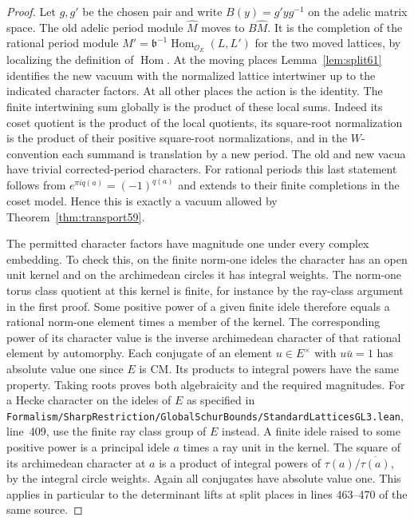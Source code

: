 \documentclass[a4paper,11pt]{article}
\theoremstyle{definition}
\theoremstyle{remark}
\newcommand{\srcloc}[2]{{\small\nolinkurl{#1.lean}}, line~#2}
\numberwithin{equation}{section}
\newcommand{\OO}{\mathcal O}
\begin{document}
\begin{proof}
Let \(g,g'\) be the chosen pair and write \(B(y)=g'y g^{-1}\)
on the adelic matrix space. The old adelic period module
\(\widehat M\) moves to \(B\widehat M\). It is the completion
of the rational period module
\(M'=\mathfrak b^{-1}\operatorname{Hom}_{\OO_E}(L,L')\) for
the two moved lattices, by localizing the definition of
\(\operatorname{Hom}\). At the moving places Lemma~\ref{lem:split61}
identifies the new vacuum with the normalized lattice intertwiner
up to the indicated character factors. At all other places the
action is the identity. The finite intertwining sum globally is
the product of these local sums. Indeed its coset quotient is
the product of the local quotients, its square-root normalization
is the product of their positive square-root normalizations, and
in the \(W\)-convention each summand is translation by a new
period. The old and new vacua have trivial corrected-period
characters. For rational periods this last statement follows
from \(e^{\pi i q(a)}=(-1)^{q(a)}\) and extends to their finite
completions in the coset model. Hence this is exactly a vacuum
allowed by Theorem~\ref{thm:transport59}.

The permitted character factors have magnitude one under every
complex embedding. To check this, on the finite norm-one ideles
the character has an open unit kernel and on the archimedean
circles it has integral weights. The norm-one torus class quotient
at this kernel is finite, for instance by the ray-class argument
in the first proof. Some positive power of a given finite
idele therefore equals a rational norm-one element times a member
of the kernel. The corresponding power of its character value is
the inverse archimedean character of that rational element by
automorphy. Each conjugate of an element \(u\in E^\times\)
with \(u\bar u=1\) has absolute value one since \(E\) is CM.
Its products to integral powers have the same property. Taking
roots proves both algebraicity and the required magnitudes.
For a Hecke character on the ideles of \(E\) as specified in
\srcloc{Formalism/SharpRestriction/GlobalSchurBounds/StandardLatticesGL3}{409},
use the finite ray class group of \(E\) instead. A finite idele
raised to some positive power is a principal idele \(a\) times
a ray unit in the kernel. The square of its archimedean character
at \(a\) is a product of integral powers of
\(\tau(a)/\overline{\tau(a)}\), by the integral circle weights.
Again all conjugates have absolute value one. This applies in
particular to the determinant lifts at split places in lines
463--470 of the same source.


\end{proof}
\end{document}
